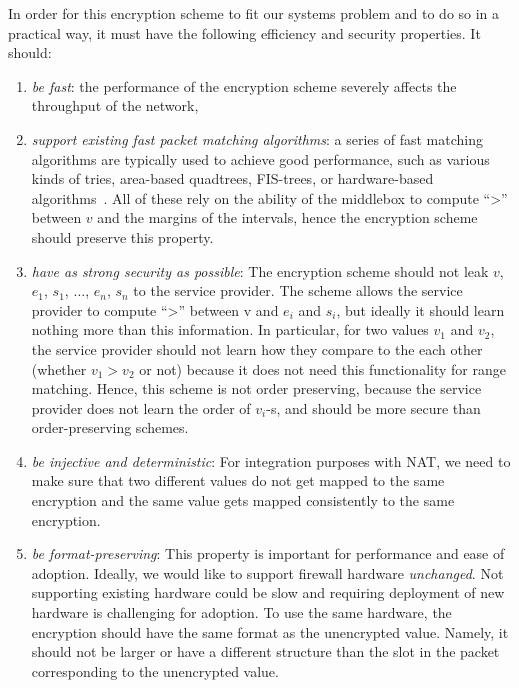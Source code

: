 
%
In order for this encryption scheme to fit our systems problem and to do so in a practical way, it must have the following efficiency and security properties. It should:
\begin{enumerate}
\item  {\em be fast}: the performance of the encryption scheme severely affects the throughput of the network,
\item {\em support existing fast packet matching algorithms}: a series of fast matching algorithms are typically used to achieve good performance, such as  various kinds of tries, area-based quadtrees, FIS-trees, or hardware-based algorithms~\cite{packet_classif}.  All of these rely on the ability of the middlebox to compute ``>'' between $v$ and the margins of the intervals, 
hence the encryption scheme should preserve this property. 
\item {\em have as strong security as possible}: The encryption scheme should not leak $v$, $e_1$, $s_1$, $\dots$, $e_n$, $s_n$ to the service provider.
The scheme allows the service provider to compute ``>'' between v and $e_i$ and $s_i$, but ideally it should learn nothing more than this information. In particular, for two values $v_1$ and $v_2$, the service provider should not learn how they compare to the each other (whether $v_1 > v_2$ or not) because it does not need this functionality for range matching. Hence, this scheme is not order preserving, because the service provider does not learn the order of $v_i$-s, and should be more secure than order-preserving schemes.   \label{req:sec}
\item {\em be injective and deterministic}: For integration purposes with NAT, we need to make sure that two different values do not get mapped to the same encryption and the same value gets mapped consistently to the same encryption. \label{req:injective}
\item {\em be format-preserving}: This property is important for performance and ease of adoption. Ideally,  we would like to support firewall hardware {\em unchanged}. Not supporting existing hardware could be slow and requiring deployment of new hardware is challenging for adoption. To use the same hardware, the  encryption should have the same format as the unencrypted value. Namely, it should not be larger or have a different structure than the slot in the packet corresponding to the unencrypted value. 
 \end{enumerate}
 
